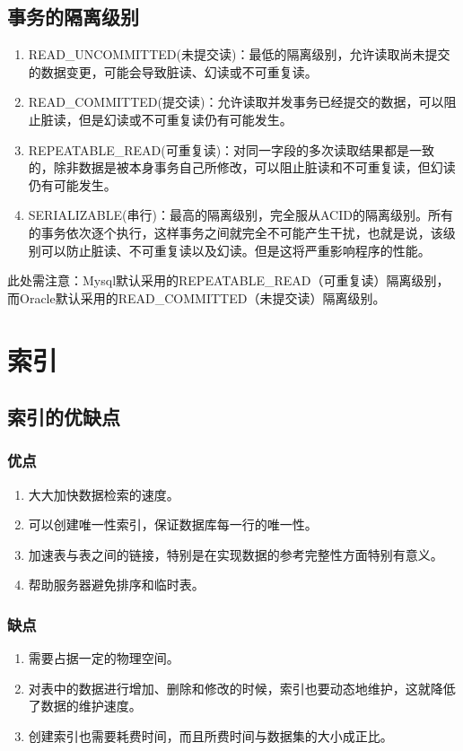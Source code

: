 \documentclass[main.tex]{subfiles}
\begin{document}
\subsection{事务的隔离级别}
\begin{enumerate}
    \item READ\_UNCOMMITTED(未提交读)：最低的隔离级别，允许读取尚未提交的数据变更，可能会导致脏读、幻读或不可重复读。
    \item READ\_COMMITTED(提交读)：允许读取并发事务已经提交的数据，可以阻止脏读，但是幻读或不可重复读仍有可能发生。
    \item REPEATABLE\_READ(可重复读)：对同一字段的多次读取结果都是一致的，除非数据是被本身事务自己所修改，可以阻止脏读和不可重复读，但幻读仍有可能发生。
    \item SERIALIZABLE(串行)：最高的隔离级别，完全服从ACID的隔离级别。所有的事务依次逐个执行，这样事务之间就完全不可能产生干扰，也就是说，该级别可以防止脏读、不可重复读以及幻读。但是这将严重影响程序的性能。
\end{enumerate}
此处需注意：Mysql默认采用的REPEATABLE\_READ（可重复读）隔离级别，而Oracle默认采用的READ\_COMMITTED（未提交读）隔离级别。

\section{索引}
\subsection{索引的优缺点}
\subsubsection{优点}
\begin{enumerate}
    \item 大大加快数据检索的速度。
    \item 可以创建唯一性索引，保证数据库每一行的唯一性。
    \item 加速表与表之间的链接，特别是在实现数据的参考完整性方面特别有意义。
    \item 帮助服务器避免排序和临时表。
\end{enumerate}
\subsubsection{缺点}
\begin{enumerate}
    \item 需要占据一定的物理空间。
    \item 对表中的数据进行增加、删除和修改的时候，索引也要动态地维护，这就降低了数据的维护速度。
    \item 创建索引也需要耗费时间，而且所费时间与数据集的大小成正比。
\end{enumerate}
\end{document}
